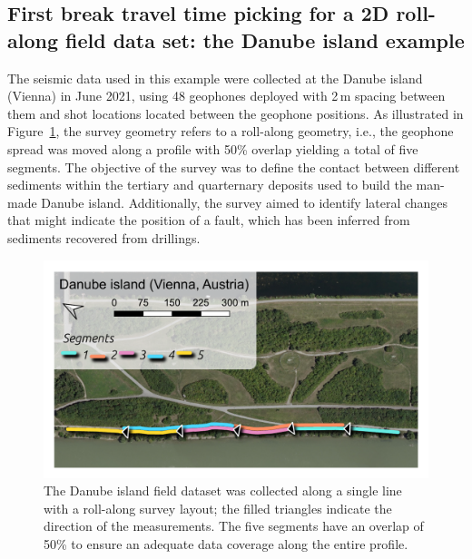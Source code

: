 \documentclass[a4paper,fleqn]{cas-sc}
\begin{document}
\subsection{First break travel time picking for a 2D roll-along field data set: the Danube island example}

The seismic data used in this example were collected at the Danube island (Vienna) in June 2021, using 48 geophones deployed with 2\,m spacing between them and shot locations located between the geophone positions. As illustrated in Figure~\ref{fig:map_danube}, the survey geometry refers to a roll-along geometry, i.e., the geophone spread was moved along a profile with 50\% overlap yielding a total of five segments. The objective of the survey was to define the contact between different sediments within the tertiary and quarternary deposits used to build the man-made Danube island. Additionally, the survey aimed to identify lateral changes that might indicate the position of a fault, which has been inferred from sediments recovered from drillings. 
\begin{figure}
	\centering
	\includegraphics[width=.75\textwidth]{./figures/map_danube.pdf}
	\caption{The Danube island field dataset was collected along a single line with a roll-along survey layout; the filled triangles indicate the direction of the measurements. The five segments have an overlap of 50\% to ensure an adequate data coverage along the entire profile.}
	\label{fig:map_danube}
\end{figure}
\end{document}
